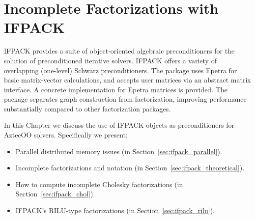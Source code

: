 % 
% 
% 
%  
%  
% 

\chapter{Incomplete Factorizations with IFPACK}
\label{chap:ifpack}


\begin{introchapter}
IFPACK provides a suite of object-oriented algebraic preconditioners for
the solution of preconditioned iterative solvers. IFPACK offers a
variety of overlapping (one-level) Schwarz preconditioners. The package
uses Epetra for basic matrix-vector calculations, and accepts user
matrices via an abstract matrix interface. A concrete implementation for
Epetra matrices is provided. The package separates graph construction
from factorization, improving performance substantially compared to other factorization packages.

In this Chapter we discuss the use of IFPACK objects as preconditioners for
AztecOO solvers.  Specifically we present:
\begin{itemize}
\item Parallel distributed memory issues (in Section~\ref{sec:ifpack_parallel}).
\item Incomplete factorizations and notation (in Section~\ref{sec:ifpack_theoretical}).
\item How to compute incomplete Cholesky factorizations (in
  Section~\ref{sec:ifpack_chol}).
\item IFPACK's RILU-type factorizations (in
  Section~\ref{sec:ifpack_rilu}).
\end{itemize}
\end{introchapter}

